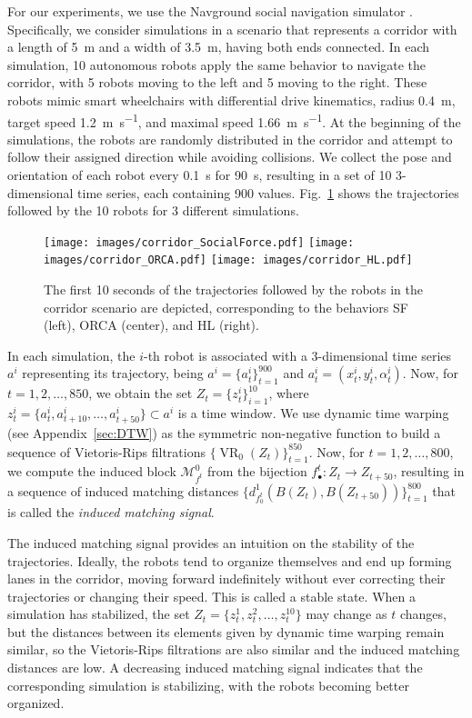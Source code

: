 \documentclass{article}
\DeclareMathOperator{\VR}{VR}
\newcommand{\cM}{\mathcal{M}}
\begin{document}
For our experiments, we use the Navground social navigation simulator \cite{navground}. 
Specifically, we consider simulations in a scenario that represents a corridor with a length of \SI{5}{\meter} and a width of \SI{3.5}{\meter}, having both ends 
connected. In each simulation, 10 autonomous robots apply the same behavior to navigate the corridor, with 5 robots moving to the left and 5 moving to the right. 
These robots mimic smart wheelchairs with differential drive kinematics, radius \SI{0.4}{\meter},  target speed \SI{1.2}{\meter\per\second}, and maximal speed \SI{1.66}{\meter\per\second}. 
At the beginning of the simulations, the robots are randomly distributed in the corridor and attempt to follow their assigned direction while avoiding collisions.
We collect the pose and orientation of each robot every \SI{0.1}{\second} for \SI{90}{\second}, resulting in a set of 10 3-dimensional time series, each containing 900 values. Fig.~\ref{fig:corridor} shows the trajectories followed by the 10 robots for 3 different simulations.

\begin{figure}[ht!]
 \centering
  \texttt{[image: images/corridor\_SocialForce.pdf]}
  \texttt{[image: images/corridor\_ORCA.pdf]}
  \texttt{[image: images/corridor\_HL.pdf]}
  \caption{
  The first 10 seconds of the trajectories followed by the robots in the corridor scenario are depicted,  corresponding to the behaviors  SF (left), ORCA (center), and HL (right).
  }
  \label{fig:corridor}
\end{figure}

In each simulation, the $i$-th robot is associated with a 3-dimensional time series $a^i$ representing its trajectory, being
$a^i= \big\{a^i_t\big\}_{t=1}^{900}$
 and $a^i_t= (x^i_t,y^i_t,\alpha^i_t)$. Now, for $t=1,2,\ldots,850$, we obtain the set $Z_t = \big\{z^i_t\big\}_{i=1}^{10}$, where $z^i_t=\{a^i_t,a^i_{t+10},\ldots,a^i_{t+50}\} \subset a^i$ is a time window.
We use dynamic time warping (see Appendix~\ref{sec:DTW}) as the symmetric non-negative function to 
build a sequence of Vietoris-Rips filtrations $\big\{\VR_0(Z_t)\big\}_{t=1}^{850}$. Now, for $t=1,2,\ldots,800$, we  compute the induced block $\cM_{f^t}^0$ from the bijection $f^t_{\bullet}: Z_t\to Z_{t+50}$, resulting in a sequence of induced matching distances $\big\{d_{f_0^t}^1(B(Z_t),B(Z_{t+50}))\big\}_{t=1}^{800}$ that is called the \emph{induced matching signal}.

The induced matching signal provides an intuition on the stability of the trajectories.
Ideally, the robots tend to organize themselves and end up forming lanes in the corridor, moving forward indefinitely without ever correcting their trajectories or changing their speed. This is called a stable state. When a simulation has stabilized, the set $Z_t = \{z^1_t,z^2_t,\ldots,z^{10}_t\}$ may change as $t$ changes, but the distances between its elements given by dynamic time warping remain similar, so the Vietoris-Rips filtrations are also similar and the induced matching distances are low. A decreasing induced matching signal indicates that the corresponding simulation is stabilizing, with the robots becoming better organized.
\end{document}
